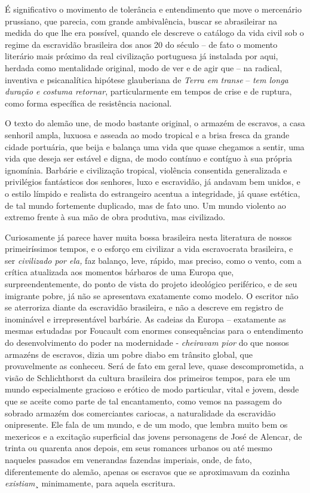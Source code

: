 É significativo o movimento de tolerância e entendimento que move o
mercenário prussiano, que parecia, com grande ambivalência, buscar se
abrasileirar na medida do que lhe era possível, quando ele descreve o
catálogo da vida civil sob o regime da escravidão brasileira dos anos 20
do século  -- de fato o momento literário mais próximo da real
civilização portuguesa já instalada por aqui, herdada como mentalidade
original, modo de ver e de agir que -- na radical, inventiva e
psicanalítica hipótese glauberiana de \emph{Terra em transe} --
\emph{tem longa duração e costuma retornar}, particularmente em tempos
de crise e de ruptura, como forma específica de resistência nacional.

O texto do alemão une, de modo bastante original, o armazém de escravos,
a casa senhoril ampla, luxuosa e asseada ao modo tropical e a brisa
fresca da grande cidade portuária, que beija e balança uma vida que
quase chegamos a sentir, uma vida que deseja ser estável e digna, de
modo contínuo e contíguo à sua própria ignomínia. Barbárie e civilização
tropical, violência consentida generalizada e privilégios fantásticos
dos senhores, luxo e escravidão, já andavam bem unidos, e o estilo
límpido e realista do estrangeiro acentua a integridade, já quase
estética, de tal mundo fortemente duplicado, mas de fato uno. Um mundo
violento ao extremo frente à sua mão de obra produtiva, mas civilizado.

Curiosamente já parece haver muita bossa brasileira nesta literatura de
nossos primeiríssimos tempos, e o esforço em civilizar a vida
escravocrata brasileira, e ser \emph{civilizado por ela,} faz balanço,
leve, rápido, mas preciso, como o vento, com a crítica atualizada aos
momentos bárbaros de uma Europa que, surpreendentemente, do ponto de
vista do projeto ideológico periférico, e de seu imigrante pobre, já não
se apresentava exatamente como modelo. O escritor não se aterroriza
diante da escravidão brasileira, e não a descreve em registro de
inominável e irrepresentável barbárie. As cadeias da Europa --
exatamente as mesmas estudadas por Foucault com enormes consequências
para o entendimento do desenvolvimento do poder na modernidade -
\emph{cheiravam pior} do que nossos armazéns de escravos, dizia um pobre
diabo em trânsito global, que provavelmente as conheceu. Será de fato em
geral leve, quase descomprometida, a visão de Schlichthorst da cultura
brasileira dos primeiros tempos, para ele um mundo especialmente
gracioso e erótico de modo particular, vital e jovem, desde que se
aceite como parte de tal encantamento, como vemos na passagem do sobrado
armazém dos comerciantes cariocas, a naturalidade da escravidão
onipresente. Ele fala de um mundo, e de um modo, que lembra muito bem os
mexericos e a excitação superficial das jovens personagens de José de
Alencar, de trinta ou quarenta anos depois, em seus romances urbanos ou
até mesmo naqueles passados em venerandas fazendas imperiais, onde, de
fato, diferentemente do alemão, apenas os escravos que se aproximavam da
cozinha \emph{existiam}¸ minimamente, para aquela escritura.

